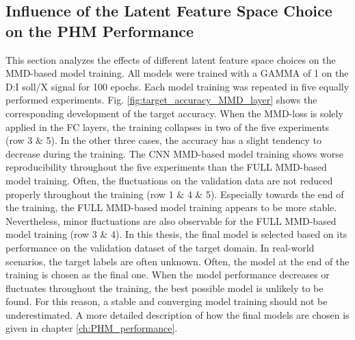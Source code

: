 \subsection{Influence of the Latent Feature Space Choice on the PHM Performance}\label{ch:Influence_Layer_real_dataset}
This section analyzes the effects of different latent feature space choices on the MMD-based model training. All models were trained with a GAMMA of 1 on the D:I soll/X signal for 100 epochs. Each model training was repeated in five equally performed experiments. Fig. \ref{fig:target_accuracy_MMD_layer} shows the corresponding development of the target accuracy. When the MMD-loss is solely applied in the FC layers, the training collapses in two of the five experiments (row 3 $\&$ 5). In the other three cases, the accuracy has a slight tendency to decrease during the training. The CNN MMD-based model training shows worse reproducibility throughout the five experiments than the FULL MMD-based model training. Often, the fluctuations on the validation data are not reduced properly throughout the training (row 1 $\&$ 4 $\&$ 5). Especially towards the end of the training, the FULL MMD-based model training appears to be more stable. Nevertheless, minor fluctuations are also observable for the FULL MMD-based model training (row 3 $\&$ 4). In this thesis, the final model is selected based on its performance on the validation dataset of the target domain. In real-world scenarios, the target labels are often unknown. Often, the model at the end of the training is chosen as the final one. When the model performance decreases or fluctuates throughout the training, the best possible model is unlikely to be found. For this reason, a stable and converging model training should not be underestimated. A more detailed description of how the final models are chosen is given in chapter \ref{ch:PHM_performance}. 

